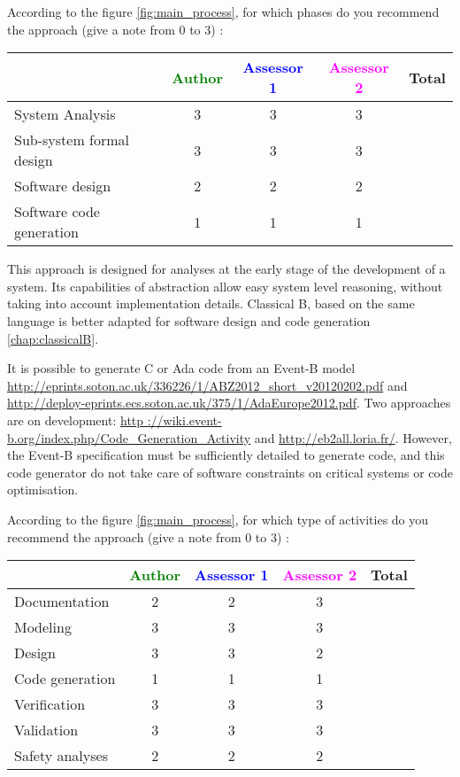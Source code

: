 According to the figure \ref{fig:main_process}, for which phases do you recommend the approach (give a note from 0 to  3) :

\begin{tabular}{|l | c | c | c | c|}
\hline
& \textcolor{green}{Author} & \textcolor{blue}{Assessor 1} & \textcolor{magenta}{Assessor 2} & Total \\
\hline 
System Analysis & 3 & 3 & 3 &  \\
\hline
Sub-system formal design & 3 & 3 & 3 & \\
\hline
Software design & 2 & 2 & 2 & \\
\hline
Software code generation & 1 & 1 & 1 & \\
\hline
\end{tabular}

\begin{author_comment}
This approach is designed for analyses at the early stage of the development of a system. Its capabilities of abstraction allow easy system level reasoning, without taking into account implementation details. Classical B, based on the same language is better adapted for software design and code generation \ref{chap:classicalB}.

It is possible to generate C or Ada code from an Event-B model \url{http://eprints.soton.ac.uk/336226/1/ABZ2012_short_v20120202.pdf} and \url{http://deploy-eprints.ecs.soton.ac.uk/375/1/AdaEurope2012.pdf}. Two  approaches are on development: \url{http ://wiki.event-b.org/index.php/Code_Generation_Activity} and \url{http://eb2all.loria.fr/}. However, the Event-B specification must be sufficiently detailed to generate code, and this code generator do not take care of software constraints on critical systems or code optimisation.
\end{author_comment}


According to the figure \ref{fig:main_process}, for which type of activities do you recommend the approach (give a note from 0 to  3) :

\begin{tabular}{|l | c | c | c | c|}
\hline
& \textcolor{green}{Author} & \textcolor{blue}{Assessor 1} & \textcolor{magenta}{Assessor 2} & Total \\
\hline 
Documentation & 2 & 2 & 3 &  \\
\hline
Modeling & 3 & 3 & 3 &  \\
\hline
Design & 3 & 3 & 2 & \\
\hline
Code generation & 1 & 1 & 1 & \\
\hline
Verification & 3 & 3 & 3 & \\
\hline
Validation & 3 & 3 & 3 & \\
\hline
Safety analyses & 2 & 2 & 2 & \\
\hline
\end{tabular}

